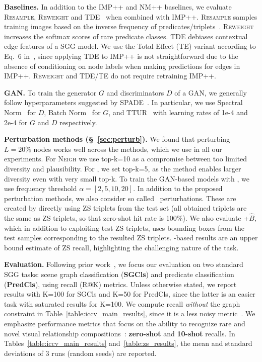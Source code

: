 \textbf{Baselines.}
In addition to the IMP++ and NM++ baselines, we evaluate \textsc{Resample}, \textsc{Reweight} and TDE~\citep{tang2020unbiased} when combined with IMP++.
\textsc{Resample} samples training images based on the inverse frequency of predicates/triplets~\citep{tang2020unbiased}. \textsc{Reweight} increases the softmax scores of rare predicate classes.
{TDE} debiases contextual edge features of a SGG model. We use the Total Effect (TE) variant according to Eq.~6 in~\citep{tang2020unbiased}, since applying TDE to IMP++ is not straightforward due to the absence of conditioning on node labels when making predictions for edges in IMP++.
\textsc{Reweight} and TDE/TE do not require retraining IMP++.


\vspace{-2pt}
\textbf{GAN.} To train the generator $G$ and discriminators $D$ of a GAN, we generally follow hyperparameters suggested by SPADE~\citep{SPADE}. In particular, we use Spectral Norm~\citep{miyato2018spectral} for $D$,  Batch Norm~\citep{ioffe2015batch} for $G$, and TTUR~\citep{heusel2017gans} with learning rates of 1e-4 and 2e-4 for $G$ and $D$ respectively.

\textbf{Perturbation methods (\S~\ref{sec:perturb}).} 
We found that perturbing $L=20\%$ nodes works well across the methods, which we use in all our experiments. For \textsc{Neigh} we use top-k=10 as a compromise between too limited diversity and plausibility. For \structn, we set top-k=5, as the method enables larger diversity even with very small top-k. To train the GAN-based models with \structn, we use frequency threshold $\alpha=[2, 5, 10, 20]$.
In addition to the proposed perturbation methods, we also consider so called \oracle~perturbations.
These are created by directly using ZS triplets from the test set (all obtained triplets are the same as ZS triplets, so that zero-shot hit rate is 100\%). We also evaluate \oracle+$\hat{B}$, which in addition to exploiting test ZS triplets, uses bounding boxes from the test samples corresponding to the resulted ZS triplets. \oracle-based results are an upper bound estimate of ZS recall, highlighting the challenging nature of the task.

\textbf{Evaluation.} Following prior work~\citep{xu2017scene,zellers2018neural,knyazev2020graph,tang2020unbiased}, we focus our evaluation on two standard SGG tasks: scene graph classification (\textbf{SGCls}) and predicate classification (\textbf{PredCls}), using recall (R@K) metrics.
Unless otherwise stated, we report results with K=100 for SGCls and K=50 for PredCls, since the latter is an easier task with saturated results for K=100. We compute recall \textit{without} the graph constraint in Table~\ref{table:iccv_main_results}, since it is a less noisy metric~\citep{knyazev2020graph}.
We emphasize performance metrics that focus on the ability to recognize rare and novel visual relationship compositions~\citep{knyazev2020graph,tang2020unbiased,suhail2021energy}: \textbf{zero-shot} and \textbf{10-shot} recalls.
In Tables~\ref{table:iccv_main_results} and~\ref{table:zs_results}, the mean and standard deviations of 3 runs (random seeds) are reported.

